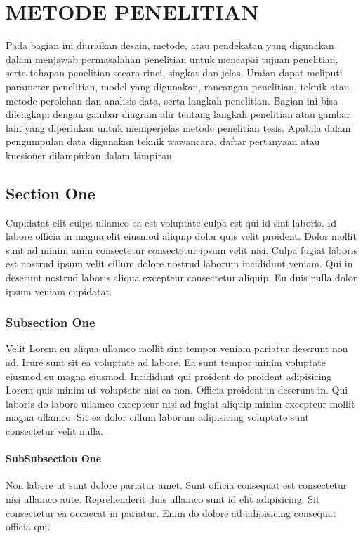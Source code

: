 \chapter{METODE PENELITIAN}

Pada bagian ini diuraikan desain, metode, atau pendekatan yang digunakan dalam menjawab permasalahan penelitian untuk mencapai tujuan penelitian, serta tahapan penelitian secara rinci, singkat dan jelas. Uraian dapat meliputi parameter penelitian, model yang digunakan, rancangan penelitian, teknik atau metode perolehan dan analisis data, serta langkah penelitian. Bagian ini bisa dilengkapi dengan gambar diagram alir tentang langkah penelitian atau gambar lain yang diperlukan untuk memperjelas metode penelitian tesis. Apabila dalam pengumpulan data digunakan teknik wawancara, daftar pertanyaan atau kuesioner dilampirkan dalam lampiran.

\section{Section One}

Cupidatat elit culpa ullamco ea est voluptate culpa est qui id sint laboris. Id labore officia in magna elit eiusmod aliquip dolor quis velit proident. Dolor mollit sunt ad minim anim consectetur consectetur ipsum velit nisi. Culpa fugiat laboris est nostrud ipsum velit cillum dolore nostrud laborum incididunt veniam. Qui in deserunt nostrud laboris aliqua excepteur consectetur aliquip. Eu duis nulla dolor ipsum veniam cupidatat.

\subsection{Subsection One}

Velit Lorem eu aliqua ullamco mollit sint tempor veniam pariatur deserunt non ad. Irure sunt sit ea voluptate ad labore. Ea sunt tempor minim voluptate eiusmod eu magna eiusmod. Incididunt qui proident do proident adipisicing Lorem quis minim ut voluptate nisi ea non. Officia proident in deserunt in. Qui laboris do labore ullamco excepteur nisi ad fugiat aliquip minim excepteur mollit magna ullamco. Sit ea dolor cillum laborum adipisicing voluptate sunt consectetur velit nulla.

\subsubsection{SubSubsection One}

Non labore ut sunt dolore pariatur amet. Sunt officia consequat est consectetur nisi ullamco aute. Reprehenderit duis ullamco sunt id elit adipisicing. Sit consectetur ea occaecat in pariatur. Enim do dolore ad adipisicing consequat officia qui.
